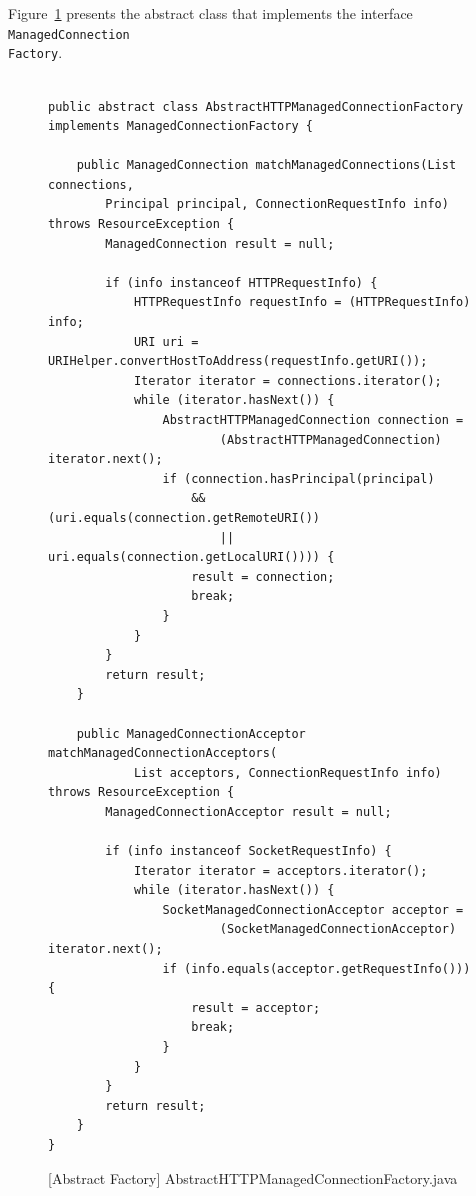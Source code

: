 
Figure~\ref{fig:AbstractHTTPManagedConnectionFactory} presents the abstract class that implements the interface \texttt{ManagedConnection\\Factory}.

\begin{figure}[htb]
\centering
\lstset{language=Java, basicstyle=\scriptsize,stepnumber=1, showspaces=false, showstringspaces=false,breaklines=true}
\begin{lstlisting}

public abstract class AbstractHTTPManagedConnectionFactory implements ManagedConnectionFactory {

    public ManagedConnection matchManagedConnections(List connections,
        Principal principal, ConnectionRequestInfo info) throws ResourceException {
        ManagedConnection result = null;

        if (info instanceof HTTPRequestInfo) {
            HTTPRequestInfo requestInfo = (HTTPRequestInfo) info;
            URI uri = URIHelper.convertHostToAddress(requestInfo.getURI());
            Iterator iterator = connections.iterator();
            while (iterator.hasNext()) {
                AbstractHTTPManagedConnection connection =
                        (AbstractHTTPManagedConnection) iterator.next();
                if (connection.hasPrincipal(principal)
                    && (uri.equals(connection.getRemoteURI())
                        || uri.equals(connection.getLocalURI()))) {
                    result = connection;
                    break;
                }
            }
        }
        return result;
    }

    public ManagedConnectionAcceptor matchManagedConnectionAcceptors(
            List acceptors, ConnectionRequestInfo info) throws ResourceException {
        ManagedConnectionAcceptor result = null;

        if (info instanceof SocketRequestInfo) {
            Iterator iterator = acceptors.iterator();
            while (iterator.hasNext()) {
                SocketManagedConnectionAcceptor acceptor =
                        (SocketManagedConnectionAcceptor) iterator.next();
                if (info.equals(acceptor.getRequestInfo())) {
                    result = acceptor;
                    break;
                }
            }
        }
        return result;
    }
}

\end{lstlisting}
\caption{[Abstract Factory] AbstractHTTPManagedConnectionFactory.java}
\label{fig:AbstractHTTPManagedConnectionFactory}
\end{figure}
\FloatBarrier

